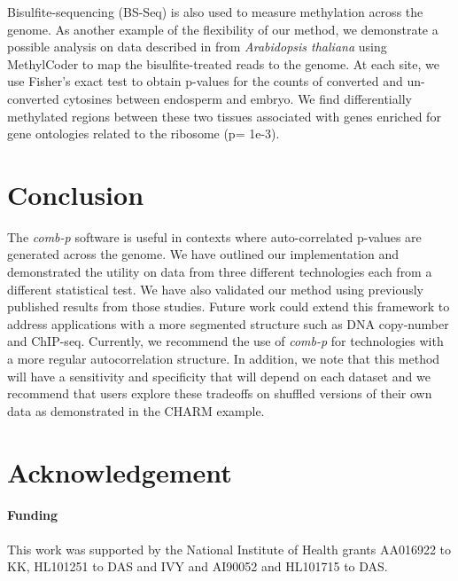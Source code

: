 \documentclass{bioinfo}
\begin{document}
\begin{methods}
Bisulfite-sequencing (BS-Seq) is also used to measure methylation across the
genome. As another example of the flexibility of our method, we demonstrate
a possible analysis on data described in \cite{Hsieh2009} from {\it Arabidopsis
thaliana} using MethylCoder \citep{Pedersen2011} to map the
bisulfite-treated reads to the genome. At each site,
we use Fisher's exact test to obtain p-values for the counts of
converted and un-converted cytosines between endosperm and embryo. We find
differentially methylated regions between these two tissues associated
with genes enriched for gene ontologies related to the ribosome (p=
1e-3).
\end{methods}

\section{Conclusion}

The \textit{comb-p} software is useful in contexts where auto-correlated
p-values are generated across the genome.
We have outlined our implementation and demonstrated
the utility on data from three different technologies each from a
different statistical test. We have also validated our method using
previously published results from those studies.
Future work could extend this framework to address applications
with a more segmented structure such as DNA copy-number and ChIP-seq.
Currently, we recommend the use of \textit{comb-p} for technologies with a
more regular autocorrelation structure. In addition, we note that this method
will have a sensitivity and specificity that will depend on each
dataset and we recommend that users explore these tradeoffs on shuffled versions
of their own data as demonstrated in the CHARM example.

\section*{Acknowledgement}
\paragraph{Funding\textcolon}
This work was supported by the National Institute of Health grants
AA016922 to KK, HL101251 to DAS and IVY and AI90052 and HL101715 to DAS.

%
%
%
%
%
%
%
%
%
\end{document}
